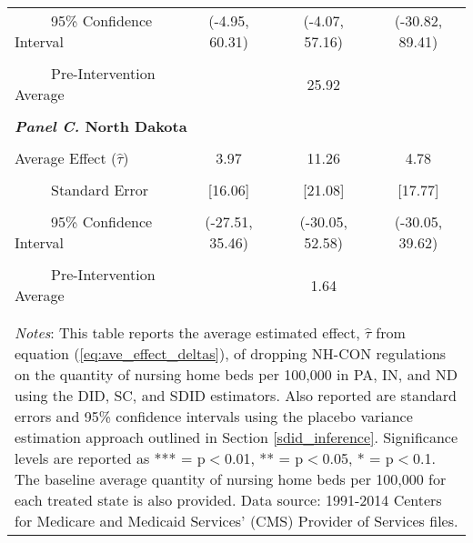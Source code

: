 \documentclass[../Main.tex]{subfiles}
\begin{document}
\begin{table}[htbp]
\begin{tabular}{l*{3}{c}}
\multicolumn{1}{l}{\ \ \ \ \ 95\% Confidence Interval}&   \multicolumn{1}{c}{(-4.95, 60.31)}&   \multicolumn{1}{c}{(-4.07, 57.16)}&   \multicolumn{1}{c}{(-30.82, 89.41)}\\
\\[-2ex]
\multicolumn{1}{l}{\ \ \ \ \ Pre-Intervention Average}&   \multicolumn{3}{c}{25.92}\\
\\[-.1ex]
\multicolumn{4}{l}{\textbf{\textit{Panel C.} North Dakota}}\\
\\[-1.5ex]
\multicolumn{1}{l}{Average Effect ($\hat{\tau}$)}&   \multicolumn{1}{c}{3.97}&   \multicolumn{1}{c}{11.26}&  \multicolumn{1}{c}{4.78}\\
\\[-2ex]
\multicolumn{1}{l}{\ \ \ \ \ Standard Error}  &\multicolumn{1}{c}{[16.06]}&\multicolumn{1}{c}{[21.08]}&\multicolumn{1}{c}{[17.77]}\\
\\[-2ex]
\multicolumn{1}{l}{\ \ \ \ \ 95\% Confidence Interval}&   \multicolumn{1}{c}{(-27.51, 35.46)}&   \multicolumn{1}{c}{(-30.05, 52.58)}&   \multicolumn{1}{c}{(-30.05, 39.62)}\\
\\[-2ex]
\multicolumn{1}{l}{\ \ \ \ \ Pre-Intervention Average}&   \multicolumn{3}{c}{1.64}\\
\\[-.1ex]
\hline\hline
\\[-2ex]
\multicolumn{4}{p{.75\linewidth}}{\footnotesize \textit{Notes}: This table reports the average estimated effect, $\hat{\tau}$ from equation (\ref{eq:ave_effect_deltas}), of dropping NH-CON regulations on the quantity of nursing home beds per 100,000 in PA, IN, and ND using the DID, SC, and SDID estimators. Also reported are standard errors and 95\% confidence intervals using the placebo variance estimation approach outlined in Section \ref{sdid_inference}. Significance levels are reported as *** = p$<$0.01, ** = p$<$0.05, * = p$<$0.1. The baseline average quantity of nursing home beds per 100,000 for each treated state is also provided. Data source: 1991-2014 Centers for Medicare and Medicaid Services’ (CMS) Provider of Services files.}
\end{tabular}
\end{table}
\vfill
\clearpage
\end{document}
